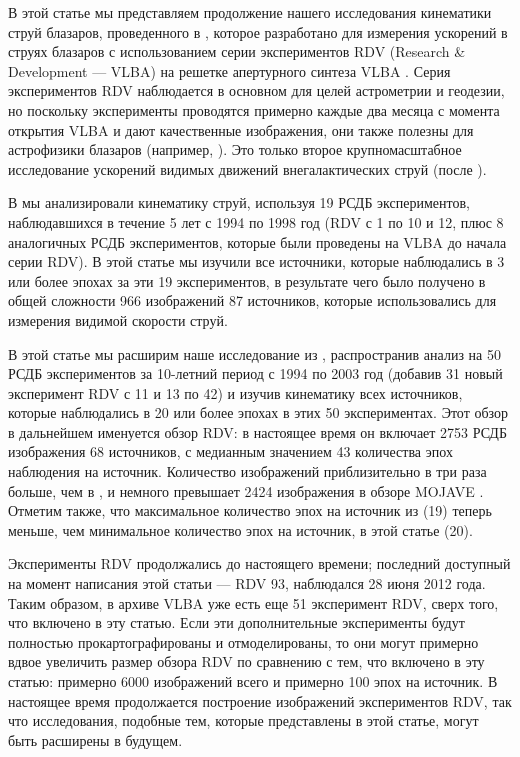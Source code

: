 В этой статье мы представляем продолжение нашего исследования кинематики струй блазаров,
проведенного в \cite{Piner_2007}, которое разработано для измерения ускорений в струях блазаров с
использованием серии экспериментов RDV (Research \& Development --- VLBA) на решетке апертурного
синтеза VLBA \cite{Petrov_2009}. Серия экспериментов RDV наблюдается в основном для целей
астрометрии и геодезии, но поскольку эксперименты проводятся примерно каждые два месяца с момента
открытия VLBA и дают качественные изображения, они также полезны для астрофизики блазаров (например,
\cite{Kovalev_2008,Pushkarev_2012b}). Это только второе крупномасштабное исследование ускорений
видимых движений внегалактических струй (после \cite{Homan_2009}).

В \cite{Piner_2007} мы анализировали кинематику струй, используя 19 РСДБ экспериментов,
наблюдавшихся в течение 5 лет с 1994 по 1998 год (RDV с 1 по 10 и 12, плюс 8 аналогичных РСДБ
экспериментов, которые были проведены на VLBA до начала серии RDV). В этой статье мы изучили
все источники, которые наблюдались в 3 или более эпохах за эти 19 экспериментов, в результате чего
было получено в общей сложности 966 изображений 87 источников, которые использовались для измерения
видимой скорости струй.

В этой статье мы расширим наше исследование из \cite{Piner_2007}, распространив анализ на 50 РСДБ
экспериментов за 10-летний период с 1994 по 2003 год (добавив 31 новый эксперимент RDV с 11 и 13 по
42) и изучив кинематику всех источников, которые наблюдались в 20 или более эпохах в этих 50
экспериментах. Этот обзор в дальнейшем именуется обзор RDV: в настоящее время он включает 2753 РСДБ
изображения 68 источников, с медианным значением 43 количества эпох наблюдения на источник.
Количество изображений приблизительно в три раза больше, чем в \cite{Piner_2007}, и немного
превышает 2424 изображения в обзоре MOJAVE \cite{Lister_2009a}. Отметим также, что максимальное
количество эпох на источник из \cite{Piner_2007} (19) теперь меньше, чем минимальное количество эпох
на источник, в этой статье (20).

Эксперименты RDV продолжались до настоящего времени; последний доступный на момент написания этой
статьи --- RDV 93, наблюдался 28 июня 2012 года. Таким образом, в архиве VLBA уже есть еще 51
эксперимент RDV, сверх того, что включено в эту статью. Если эти дополнительные эксперименты будут
полностью прокартографированы и отмоделированы, то они могут примерно вдвое увеличить размер
обзора RDV по сравнению с тем, что включено в эту статью: примерно 6000 изображений всего и
примерно 100 эпох на источник. В настоящее время продолжается построение изображений экспериментов
RDV, так что исследования, подобные тем, которые представлены в этой статье, могут быть расширены в
будущем.

